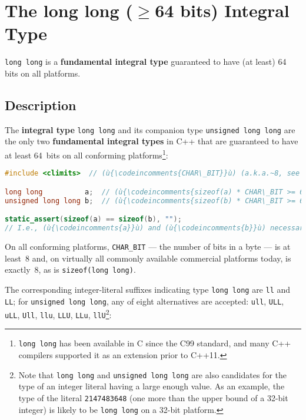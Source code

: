 \newpage
\section[{\tt long} {\tt long}]{The {\SecCode long} {\SecCode long} ($\geq$64 bits) Integral Type}\label{long-long}


\texttt{long long} is a \textbf{fundamental integral type} guaranteed to have (at least) 64 bits on all
platforms.

\subsection[Description]{Description}\label{description}

The \textbf{integral type} \texttt{long}~\texttt{long} and its companion
type \texttt{unsigned}~\texttt{long}~\texttt{long} are the only two
\textbf{fundamental integral types} in C++ that are guaranteed to have
at least 64~bits on all conforming platforms{\cprotect\footnote{\texttt{long}~\texttt{long}
has been available in C since the C99 standard, and many C++ compilers
supported it as an extension prior to C++11.}}:

\begin{lstlisting}[language=C++]
#include <climits>  // (ù{\codeincomments{CHAR\_BIT}}ù) (a.k.a.~8, see below)

long long          a;  // (ù{\codeincomments{sizeof(a) * CHAR\_BIT >= 64}}ù)
unsigned long long b;  // (ù{\codeincomments{sizeof(b) * CHAR\_BIT >= 64}}ù)

static_assert(sizeof(a) == sizeof(b), "");
// I.e., (ù{\codeincomments{a}}ù) and (ù{\codeincomments{b}}ù) necessarily have the same size in every program.
\end{lstlisting}

\noindent On all conforming platforms, \texttt{CHAR\_BIT} --- the number of bits
in a byte --- is at least~8 and, on virtually all commonly available
commercial platforms today, is exactly~8, as is
\texttt{sizeof(long}~\texttt{long)}.

The corresponding integer-literal suffixes indicating type
\texttt{long}~\texttt{long} are \texttt{ll} and \texttt{LL}; for
\texttt{unsigned}~\texttt{long}~\texttt{long}, any of eight alternatives
are accepted: \texttt{ull}, \texttt{ULL}, \texttt{uLL}, \texttt{Ull},
\texttt{llu}, \texttt{LLU}, \texttt{LLu},
\texttt{llU}{\cprotect\footnote{Note that \texttt{long}~\texttt{long}
and \texttt{unsigned}~\texttt{long}~\texttt{long} are also candidates
for the type of an integer literal having a large enough value. As an
example, the type of the literal \texttt{2147483648} (one more than
the upper bound of a 32-bit integer) is likely to be
\texttt{long}~\texttt{long} on a 32-bit platform.}}:

